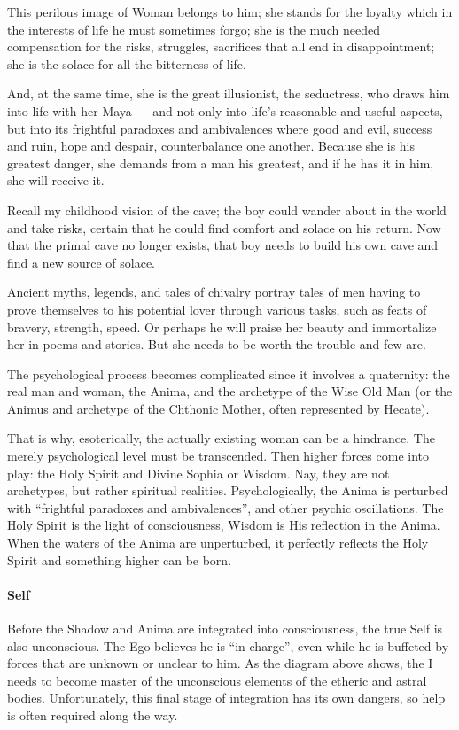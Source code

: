 \begin{quotex}
This perilous image of Woman belongs to him; she stands for the loyalty which in the interests of life he must sometimes forgo; she is the much needed compensation for the risks, struggles, sacrifices that all end in disappointment; she is the solace for all the bitterness of life.

And, at the same time, she is the great illusionist, the seductress, who draws him into life with her Maya — and not only into life's reasonable and useful aspects, but into its frightful paradoxes and ambivalences where good and evil, success and ruin, hope and despair, counterbalance one another. Because she is his greatest danger, she demands from a man his greatest, and if he has it in him, she will receive it. 

\end{quotex}
Recall my childhood vision of the cave; the boy could wander about in the world and take risks, certain that he could find comfort and solace on his return. Now that the primal cave no longer exists, that boy needs to build his own cave and find a new source of solace.

Ancient myths, legends, and tales of chivalry portray tales of men having to prove themselves to his potential lover through various tasks, such as feats of bravery, strength, speed. Or perhaps he will praise her beauty and immortalize her in poems and stories. But she needs to be worth the trouble and few are.

The psychological process becomes complicated since it involves a quaternity: the real man and woman, the Anima, and the archetype of the Wise Old Man (or the Animus and archetype of the Chthonic Mother, often represented by Hecate).

That is why, esoterically, the actually existing woman can be a hindrance. The merely psychological level must be transcended. Then higher forces come into play: the Holy Spirit and Divine Sophia or Wisdom. Nay, they are not archetypes, but rather spiritual realities. Psychologically, the Anima is perturbed with “frightful paradoxes and ambivalences”, and other psychic oscillations. The Holy Spirit is the light of consciousness, Wisdom is His reflection in the Anima. When the waters of the Anima are unperturbed, it perfectly reflects the Holy Spirit and something higher can be born.

\paragraph{Self}
Before the Shadow and Anima are integrated into consciousness, the true Self is also unconscious. The Ego believes he is “in charge”, even while he is buffeted by forces that are unknown or unclear to him. As the diagram above shows, the I needs to become master of the unconscious elements of the etheric and astral bodies. Unfortunately, this final stage of integration has its own dangers, so help is often required along the way.

